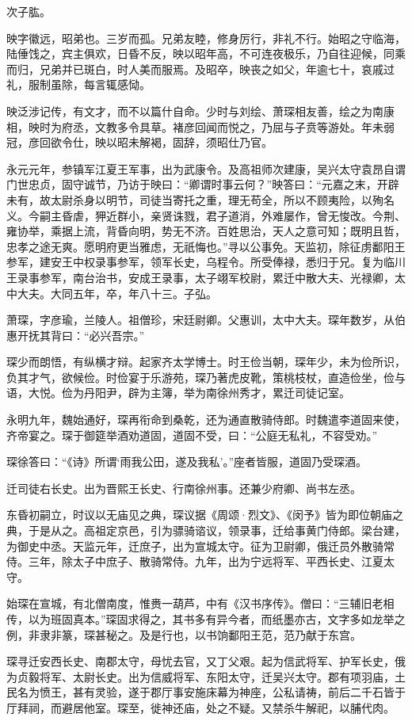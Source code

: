 \documentclass[12pt,UTF8]{ctexbook}
\begin{document}
次子肱。

映字徽远，昭弟也。三岁而孤。兄弟友睦，修身厉行，非礼不行。始昭之守临海，陆倕饯之，宾主俱欢，日昏不反，映以昭年高，不可连夜极乐，乃自往迎候，同乘而归，兄弟并已斑白，时人美而服焉。及昭卒，映丧之如父，年逾七十，哀戚过礼，服制虽除，每言辄感恸。

映泛涉记传，有文才，而不以篇什自命。少时与刘绘、萧琛相友善，绘之为南康相，映时为府丞，文教多令具草。褚彦回闻而悦之，乃屈与子贲等游处。年未弱冠，彦回欲令仕，映以昭未解褐，固辞，须昭仕乃官。

永元元年，参镇军江夏王军事，出为武康令。及高祖师次建康，吴兴太守袁昂自谓门世忠贞，固守诚节，乃访于映曰：“卿谓时事云何？”映答曰：“元嘉之末，开辟未有，故太尉杀身以明节，司徒当寄托之重，理无苟全，所以不顾夷险，以殉名义。今嗣主昏虐，狎近群小，亲贤诛戮，君子道消，外难屡作，曾无悛改。今荆、雍协举，乘据上流，背昏向明，势无不济。百姓思治，天人之意可知；既明且哲，忠孝之途无爽。愿明府更当雅虑，无祇悔也。”寻以公事免。天监初，除征虏鄱阳王参军，建安王中权录事参军，领军长史，乌程令。所受俸禄，悉归于兄。复为临川王录事参军，南台治书，安成王录事，太子翊军校尉，累迁中散大夫、光禄卿，太中大夫。大同五年，卒，年八十三。子弘。

萧琛，字彦瑜，兰陵人。祖僧珍，宋廷尉卿。父惠训，太中大夫。琛年数岁，从伯惠开抚其背曰：“必兴吾宗。”

琛少而朗悟，有纵横才辩。起家齐太学博士。时王俭当朝，琛年少，未为俭所识，负其才气，欲候俭。时俭宴于乐游苑，琛乃著虎皮靴，策桃枝杖，直造俭坐，俭与语，大悦。俭为丹阳尹，辟为主簿，举为南徐州秀才，累迁司徒记室。

永明九年，魏始通好，琛再衔命到桑乾，还为通直散骑侍郎。时魏遣李道固来使，齐帝宴之。琛于御筵举酒劝道固，道固不受，曰：“公庭无私礼，不容受劝。”

琛徐答曰：“《诗》所谓‘雨我公田，遂及我私’。”座者皆服，道固乃受琛酒。

迁司徒右长史。出为晋熙王长史、行南徐州事。还兼少府卿、尚书左丞。

东昏初嗣立，时议以无庙见之典，琛议据《周颂·烈文》、《闵予》皆为即位朝庙之典，于是从之。高祖定京邑，引为骠骑谘议，领录事，迁给事黄门侍郎。梁台建，为御史中丞。天监元年，迁庶子，出为宣城太守。征为卫尉卿，俄迁员外散骑常侍。三年，除太子中庶子、散骑常侍。九年，出为宁远将军、平西长史、江夏太守。

始琛在宣城，有北僧南度，惟赉一葫芦，中有《汉书序传》。僧曰：“三辅旧老相传，以为班固真本。”琛固求得之，其书多有异今者，而纸墨亦古，文字多如龙举之例，非隶非篆，琛甚秘之。及是行也，以书饷鄱阳王范，范乃献于东宫。

琛寻迁安西长史、南郡太守，母忧去官，又丁父艰。起为信武将军、护军长史，俄为贞毅将军、太尉长史。出为信威将军、东阳太守，迁吴兴太守。郡有项羽庙，土民名为愤王，甚有灵验，遂于郡厅事安施床幕为神座，公私请祷，前后二千石皆于厅拜祠，而避居他室。琛至，徙神还庙，处之不疑。又禁杀牛解祀，以脯代肉。
\end{document}
